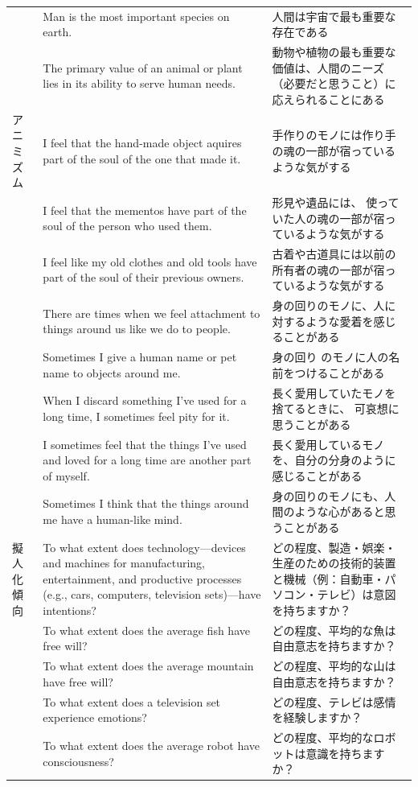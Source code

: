 \documentclass[a4j,12pt]{jreport}
\begin{document}
\begin{center}
{\begin{longtable}{lp{5cm}p{5cm}}
&Man is the most important species on earth.&人間は宇宙で最も重要な存在である\\
&The primary value of an animal or plant lies in its ability to serve human needs.&動物や植物の最も重要な価値は、人間のニーズ（必要だと思うこと）に応えられることにある\\
アニミズム&I feel that the hand-made object aquires part of the soul of the one that made it.&手作りのモノには作り手の魂の一部が宿っているような気がする\\
&I feel that the mementos have part of the soul of the person who used them.&形見や遺品には、 使っていた人の魂の一部が宿っているような気がする\\
&I feel like my old clothes and old tools have part of the soul of their previous owners.&古着や古道具には以前の所有者の魂の一部が宿っているような気がする\\
&There are times when we feel attachment to things around us like we do to people.&身の回りのモノに、人に対するような愛着を感じることがある\\
&Sometimes I give a human name or pet name to objects around me.&身の回り のモノに人の名前をつけることがある\\
&When I discard something I've used for a long time, I sometimes feel pity for it.&長く愛用していたモノを捨てるときに、 可哀想に思うことがある\\
&I sometimes feel that the things I've used and loved for a long time are another part of myself.&長く愛用しているモノを、自分の分身のように感じることがある\\
&Sometimes I think that the things around me have a human-like mind.&身の回りのモノにも、人間のような心があると思うことがある\\
擬人化傾向&To what extent does technology—devices and machines for manufacturing, entertainment, and productive processes (e.g., cars, computers, television sets)—have intentions?&どの程度、製造・娯楽・生産のための技術的装置と機械（例：自動車・パソコン・テレビ）は意図を持ちますか？\\
&To what extent does the average fish have free will?&どの程度、平均的な魚は自由意志を持ちますか？\\
&To what extent does the average mountain have free will?&どの程度、平均的な山は自由意志を持ちますか？\\
&To what extent does a television set experience emotions?&どの程度、テレビは感情を経験しますか？\\
&To what extent does the average robot have consciousness?&どの程度、平均的なロボットは意識を持ちますか？\\

\end{longtable}}
\end{center}
\end{document}
